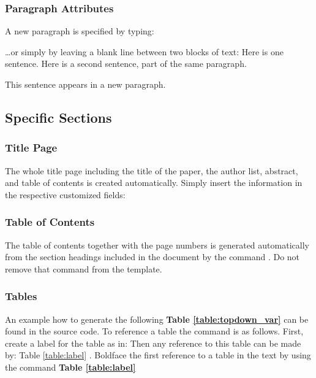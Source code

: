 \documentclass[12pt,fleqn]{article}
\let\oldverbatim\verbatim
\let\oldendverbatim\endverbatim
\renewenvironment{verbatim}{\endgraf\footnotesize\singlespace\oldverbatim}{\oldendverbatim\endsinglespace}
\begin{document}
\subsubsection{Paragraph Attributes}

A new paragraph is specified by typing:
\begin{verbatim}
\par
\end{verbatim}
\ldots or simply by leaving a blank line between two blocks of text:
\begin{verbatim}
Here is one sentence.
Here is a second sentence, part of the same paragraph.

This sentence appears in a new paragraph.
\end{verbatim}

\subsection{Specific Sections}

\subsubsection{Title Page}

The whole title page including the title of the paper, the author list, 
abstract, and table of contents is created automatically. Simply insert the 
information in the respective customized fields:
\begin{verbatim}
\title{}
\author{}
\affil{}
\abstract{}
\end{verbatim}

\subsubsection{Table of Contents}

The table of contents together with the page numbers is generated automatically 
from the section headings included in the document by the command 
\verb@\tableofcontents@. Do not remove that command from the template.

\subsubsection{Tables}

An example how to generate the following \textbf{Table \ref{table:topdown_var}} 
can be found in the source code. To reference a table the command is as 
follows. First, create a label for the table as in:
\begin{verbatim}
\label{table:label}
\end{verbatim}
Then any reference to this table can be made by:
\begin{verbatim}
Table \ref{table:label}
\end{verbatim}.
Boldface the first reference to a table in the text by using the command 
\begin{verbatim}
\textbf{Table \ref{table:label}}
\end{verbatim}
\end{document}
